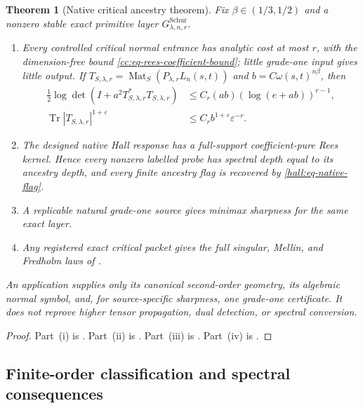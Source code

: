 \documentclass[10pt,reqno]{amsart}
\theoremstyle{plain}
\newtheorem{theorem}{Theorem}[section]
\theoremstyle{definition}
\theoremstyle{remark}
\begin{document}
\begin{theorem}[Native critical ancestry theorem]
\label{cc:thm-source-level-compiler}
Fix $\beta\in(1/3,1/2)$ and a nonzero stable exact primitive layer
$G^{\mathrm{Schur}}_{\lambda,n,r}$.
\begin{enumerate}[label=\textup{(\roman*)},leftmargin=2.7em]
\item Every controlled critical normal entrance has analytic cost at most
      $r$, with the dimension-free bound
      \eqref{cc:eq-rees-coefficient-bound}; little grade-one input gives
      little output.  If
      $T_{S,\lambda,r}=\operatorname{Mat}_S(P_{\lambda,r}L_n(s,t))$ and
      $b=C\omega(s,t)^{n\beta}$, then
      \begin{align*}
       \frac12\log\det(I+a^2T_{S,\lambda,r}^*T_{S,\lambda,r})
       &\le C_r(ab)(\log(e+ab))^{r-1},\\
       \operatorname{Tr}|T_{S,\lambda,r}|^{1+\varepsilon}
       &\le C_rb^{1+\varepsilon}\varepsilon^{-r}.
      \end{align*}
\item The designed native Hall response has a full-support coefficient-pure
      Rees kernel.  Hence every nonzero labelled probe has spectral depth
      equal to its ancestry depth, and every finite ancestry flag is
      recovered by \eqref{hall:eq-native-flag}.
\item A replicable natural grade-one source gives minimax sharpness for the
      same exact layer.
\item Any registered exact critical packet gives the full singular, Mellin,
      and Fredholm laws of .
\end{enumerate}
An application supplies only its canonical second-order geometry, its
algebraic normal symbol, and, for source-specific sharpness, one grade-one
certificate.  It does not reprove higher tensor propagation, dual detection,
or spectral conversion.
\end{theorem}

\begin{proof}
Part~\textup{(i)} is .
Part~\textup{(ii)} is
.
Part~\textup{(iii)} is .
Part~\textup{(iv)} is .
\end{proof}

\subsection{Finite-order classification and spectral consequences}
\label{cc:subsec-compiled-consequences}
\end{document}
